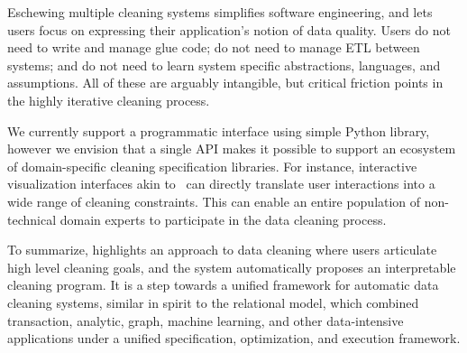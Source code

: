   Eschewing multiple cleaning systems simplifies software engineering, and lets users focus on expressing their application's notion of data quality.  Users do not need to write and manage glue code; do not need to manage ETL between systems; and do not need to learn system specific abstractions, languages, and assumptions.  All of these are arguably intangible, but critical friction points in the highly iterative cleaning process.  

  We currently support a programmatic interface using simple Python library, however we envision that a single API makes it possible to support an ecosystem of domain-specific cleaning specification libraries.  For instance,  interactive visualization interfaces akin to~\cite{trifacta,kandel2011wrangler,DBLP:journals/pvldb/0002M13,wu2012demonstration} can directly translate user interactions into a wide range of cleaning constraints.   This can enable an entire population of non-technical domain experts to participate in the data cleaning process.

\smallskip
To summarize, \sys highlights an approach to data cleaning where users articulate high level cleaning goals, and the system automatically proposes an interpretable cleaning program.  It is a step towards a unified framework for automatic data cleaning systems, similar in spirit to the relational model, which combined transaction, analytic, graph, machine learning, and other data-intensive applications under a unified specification, optimization, and execution framework.









% 
% 
% 
% 












